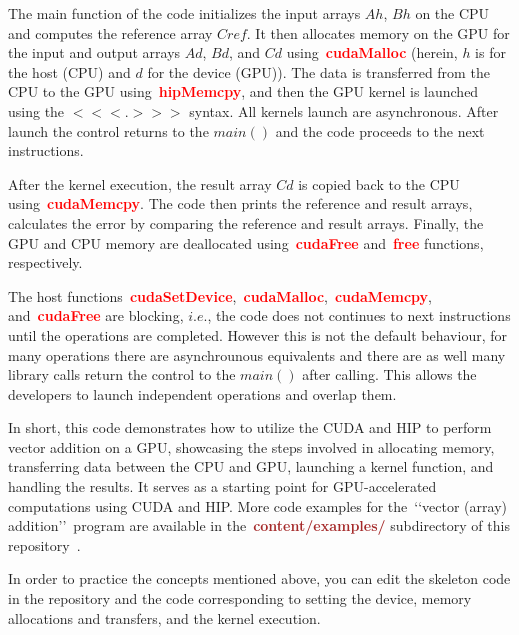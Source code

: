 \par
The main function of the code initializes the input arrays $Ah$, $Bh$ on the CPU and computes the reference array $Cref$.
It then allocates memory on the GPU for the input and output arrays $Ad$, $Bd$, and $Cd$ using~\textbf{\textcolor{red}{cudaMalloc}} (herein, $h$ is for the host (CPU) and $d$ for the device (GPU)).
The data is transferred from the CPU to the GPU using~\textbf{\textcolor{red}{hipMemcpy}}, and then the GPU kernel is launched using the $<<<.>>>$ syntax.
All kernels launch are asynchronous.
After launch the control returns to the $main()$ and the code proceeds to the next instructions.


\par
After the kernel execution, the result array $Cd$ is copied back to the CPU using~\textbf{\textcolor{red}{cudaMemcpy}}.
The code then prints the reference and result arrays, calculates the error by comparing the reference and result arrays.
Finally, the GPU and CPU memory are deallocated using~\textbf{\textcolor{red}{cudaFree}} and~\textbf{\textcolor{red}{free}} functions, respectively.


\par
The host functions~\textbf{\textcolor{red}{cudaSetDevice}},~\textbf{\textcolor{red}{cudaMalloc}},~\textbf{\textcolor{red}{cudaMemcpy}}, and~\textbf{\textcolor{red}{cudaFree}} are blocking, $i.e.$, the code does not continues to next instructions until the operations are completed.
However this is not the default behaviour, for many operations there are asynchrounous equivalents and there are as well many library calls return the control to the $main()$ after calling. 
This allows the developers to launch independent operations and overlap them.


\par
In short, this code demonstrates how to utilize the CUDA and HIP to perform vector addition on a GPU, showcasing the steps involved in allocating memory, transferring data between the CPU and GPU, launching a kernel function, and handling the results.
It serves as a starting point for GPU-accelerated computations using CUDA and HIP.
More code examples for the~\lq\lq vector (array) addition\rq\rq~program are available in the~\textbf{\textcolor{brown}{content/examples/}} subdirectory of this repository~\cite{gpu-programming-examples}.


\par
In order to practice the concepts mentioned above, you can edit the skeleton code in the repository and the code corresponding to setting the device, memory allocations and transfers, and the kernel execution.


